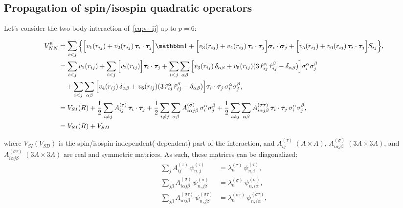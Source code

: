\documentclass[aps,prc,twocolumn,superscriptaddress,floatfix]{revtex4-1}
\begin{document}
\subsection{Propagation of spin/isospin quadratic operators}
\label{sec:p2}
Let's consider the two-body interaction of~\cref{eq:v_ij} up to $p=6$:
\begin{widetext}
\begin{align}
V_{NN}^6&=\sum_{i<j}\Big\{	
 \Big[v_1(r_{ij})+v_2(r_{ij})\,\bm\tau_i\cdot\bm\tau_j\Big]\mathbbm1
+\Big[v_3(r_{ij})+v_4(r_{ij})\,\bm\tau_i\cdot\bm\tau_j\Big]\bm\sigma_i\cdot\bm\sigma_j
+\Big[v_5(r_{ij})+v_6(r_{ij})\,\bm\tau_i\cdot\bm\tau_j\Big]S_{ij}\Big\} , \nonumber \\
&=\sum_{i<j}v_1(r_{ij})+\sum_{i<j}\Big[v_2(r_{ij})\Big]\bm\tau_i\cdot\bm\tau_j
+\sum_{i<j}\sum_{\alpha\beta}\Big[v_3(r_{ij})\,\delta_{\alpha\beta}
+v_5(r_{ij})(3\,\hat{r}_{ij}^\alpha\,\hat{r}_{ij}^\beta-\delta_{\alpha\beta})\Big]\sigma_i^\alpha\sigma_j^\beta \nonumber \\ 
&\quad+\sum_{i<j}\sum_{\alpha\beta}\Big[v_4(r_{ij})\,\delta_{\alpha\beta}
+v_6(r_{ij})(3\,\hat{r}_{ij}^\alpha\,\hat{r}_{ij}^\beta-\delta_{\alpha\beta})\Big]\bm\tau_i\cdot\bm\tau_j\,\sigma_i^\alpha\sigma_j^\beta , \nonumber \\
&=V_{SI}(R)+{1\over2}\sum_{i\ne j}A^{(\tau)}_{ij}\,\bm\tau_i\cdot\bm\tau_j
+{1\over2}\sum_{i\ne j}\sum_{\alpha\beta}A^{(\sigma)}_{i\alpha j\beta}\,\sigma_i^{\alpha}\sigma_j^{\beta}
+{1\over2}\sum_{i\ne j}\sum_{\alpha\beta}A^{(\sigma\tau)}_{i\alpha j\beta} \,\bm\tau_i\cdot\bm\tau_j\,\sigma_i^{\alpha}\sigma_j^{\beta} , \nonumber \\
&=V_{SI}(R)+V_{SD} \, \label{eq:v_si+sd}
\end{align}
\end{widetext}
where $V_{SI}(V_{SD})$ is the spin/isospin-independent(-dependent) part of the interaction, 
and $A^{(\tau)}_{ij}\;(A\times A)$, $A^{(\sigma)}_{i\alpha j\beta}\;(3A\times 3A)$, 
and $A^{(\sigma\tau)}_{i\alpha j\beta}\;(3A\times 3A)$
are real and symmetric matrices.
As such, these matrices can be diagonalized:
\begin{align}
\sum_{j}A^{(\tau)}_{ij}\,\psi_{n,j}^{(\tau)}&=\lambda_n^{(\tau)}\,\psi_{n,i}^{(\tau)} , \nonumber \\
\sum_{j\beta}A^{(\sigma)}_{i\alpha j\beta}\,\psi_{n,j\beta}^{(\sigma)}&=\lambda_n^{(\sigma)}\,\psi_{n,i\alpha}^{(\sigma)} , \nonumber \\
\sum_{j\beta}A^{(\sigma\tau)}_{i\alpha j\beta}\,\psi_{n,j\beta}^{(\sigma\tau)}&=\lambda_n^{(\sigma\tau)}\,\psi_{n,i\alpha}^{(\sigma\tau)} , \nonumber
\end{align}
\end{document}
